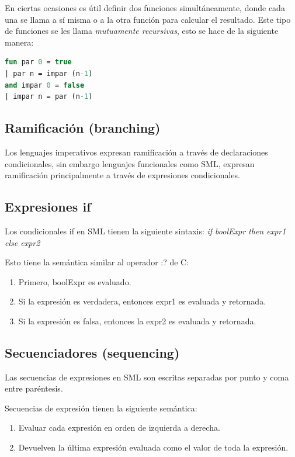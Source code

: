 \documentclass[10pt,journal,compsoc]{IEEEtran}
\begin{document}
En ciertas ocasiones es \'util definir dos funciones simult\'aneamente, donde cada una se llama a s\'i misma o a la otra funci\'on para calcular el resultado. Este tipo de funciones se les llama \textit{mutuamente recursivas}, esto se hace de la siguiente manera:

\begin{lstlisting}[language=ML, caption=Ejemplo Funciones Mutuamente Recursivas]
fun par 0 = true
| par n = impar (n-1)
and impar 0 = false
| impar n = par (n-1)
\end{lstlisting}

\subsection{Ramificaci\'on (branching)}
Los lenguajes imperativos expresan ramificaci\'on a trav\'es de declaraciones condicionales, sin embargo lenguajes funcionales como SML, expresan ramificaci\'on principalmente a trav\'es de expresiones condicionales.

\subsection{Expresiones if}
Los condicionales if en SML tienen la siguiente sintaxis: \textit{if boolExpr then expr1 else expr2}

Esto tiene la sem\'antica similar al operador :? de C:
\begin{enumerate}
	\item Primero, boolExpr es evaluado.
	\item Si la expresi\'on es verdadera, entonces expr1 es evaluada y retornada.
	\item Si la expresi\'on es falsa, entonces la expr2 es evaluada y retornada.
\end{enumerate}

\subsection{Secuenciadores (sequencing)}
Las secuencias de expresiones en SML son escritas separadas por punto y coma entre par\'entesis.

Secuencias de expresi\'on tienen la siguiente sem\'antica:

\begin{enumerate}
	\item Evaluar cada expresi\'on en orden de izquierda a derecha.
	\item Devuelven la \'ultima expresi\'on evaluada como el valor de toda la expresi\'on.
\end{enumerate}
\end{document}
